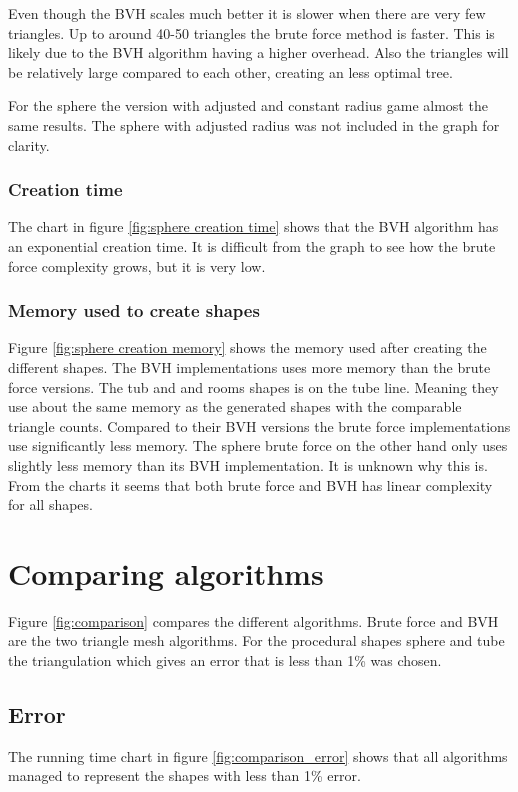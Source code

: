 \documentclass[11pt,twoside,a4paper]{report}
\begin{document}
Even though the BVH scales much better it is slower when there are very few triangles. Up to around 40-50 triangles the brute force method is faster. This is likely due to the BVH algorithm having a higher overhead. Also the triangles will be relatively large compared to each other, creating an less optimal tree.

For the sphere the version with adjusted and constant radius game almost the same results. The sphere with adjusted radius was not included in the graph for clarity.

\subsubsection{Creation time}
The chart in figure \ref{fig:sphere creation time} shows that the BVH algorithm has an exponential creation time. It is difficult from the graph to see how the brute force complexity grows, but it is very low.

\subsubsection{Memory used to create shapes}
Figure \ref{fig:sphere creation memory} shows the memory used after creating the different shapes. The BVH implementations uses more memory than the brute force versions. The tub and and rooms shapes is on the tube line. Meaning they use about the same memory as the generated shapes with the comparable triangle counts. Compared to their BVH versions the brute force implementations use significantly less memory. The sphere brute force on the other hand only uses slightly less memory than its BVH implementation. It is unknown why this is. From the charts it seems that both brute force and BVH has linear complexity for all shapes.

\section{Comparing algorithms}

Figure \ref{fig:comparison} compares the different algorithms. Brute force and BVH are the two triangle mesh algorithms. For the procedural shapes sphere and tube the triangulation which gives an error that is less than 1\% was chosen.

\subsection{Error}
The running time chart in figure \ref{fig:comparison_error} shows that all algorithms managed to represent the shapes with less than 1\% error. 
\end{document}

